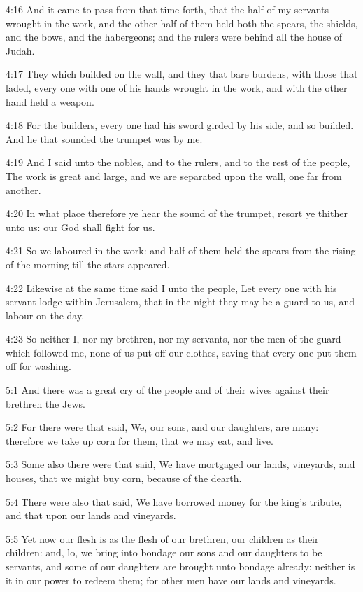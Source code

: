 4:16 And it came to pass from that time forth, that the half of my
servants wrought in the work, and the other half of them held both the
spears, the shields, and the bows, and the habergeons; and the rulers
were behind all the house of Judah.

4:17 They which builded on the wall, and they that bare burdens, with
those that laded, every one with one of his hands wrought in the work,
and with the other hand held a weapon.

4:18 For the builders, every one had his sword girded by his side, and
so builded. And he that sounded the trumpet was by me.

4:19 And I said unto the nobles, and to the rulers, and to the rest of
the people, The work is great and large, and we are separated upon the
wall, one far from another.

4:20 In what place therefore ye hear the sound of the trumpet, resort
ye thither unto us: our God shall fight for us.

4:21 So we laboured in the work: and half of them held the spears from
the rising of the morning till the stars appeared.

4:22 Likewise at the same time said I unto the people, Let every one
with his servant lodge within Jerusalem, that in the night they may be
a guard to us, and labour on the day.

4:23 So neither I, nor my brethren, nor my servants, nor the men of
the guard which followed me, none of us put off our clothes, saving
that every one put them off for washing.

5:1 And there was a great cry of the people and of their wives against
their brethren the Jews.

5:2 For there were that said, We, our sons, and our daughters, are
many: therefore we take up corn for them, that we may eat, and live.

5:3 Some also there were that said, We have mortgaged our lands,
vineyards, and houses, that we might buy corn, because of the dearth.

5:4 There were also that said, We have borrowed money for the king's
tribute, and that upon our lands and vineyards.

5:5 Yet now our flesh is as the flesh of our brethren, our children as
their children: and, lo, we bring into bondage our sons and our
daughters to be servants, and some of our daughters are brought unto
bondage already: neither is it in our power to redeem them; for other
men have our lands and vineyards.


